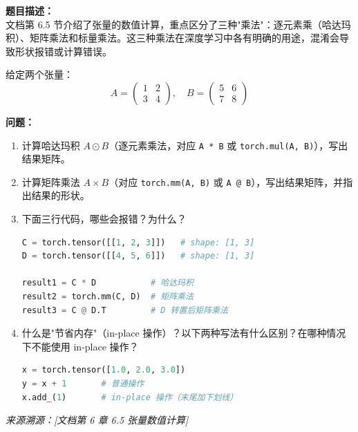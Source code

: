 \documentclass[a4paper,11pt]{ctexart}
\begin{document}
\begin{problembox}
    \textbf{题目描述：}\\
    文档第 6.5 节介绍了张量的数值计算，重点区分了三种"乘法"：逐元素乘（哈达玛积）、矩阵乘法和标量乘法。这三种乘法在深度学习中各有明确的用途，混淆会导致形状报错或计算错误。

    \vspace{0.3cm}
    给定两个张量：
    \[
    A = \begin{pmatrix} 1 & 2 \\ 3 & 4 \end{pmatrix}, \quad
    B = \begin{pmatrix} 5 & 6 \\ 7 & 8 \end{pmatrix}
    \]

    \textbf{问题：}
    \begin{enumerate}[(1)]
        \item 计算哈达玛积 $A \odot B$（逐元素乘法，对应 \texttt{A * B} 或 \texttt{torch.mul(A, B)}），写出结果矩阵。

        \item 计算矩阵乘法 $A \times B$（对应 \texttt{torch.mm(A, B)} 或 \texttt{A @ B}），写出结果矩阵，并指出结果的形状。

        \item 下面三行代码，哪些会报错？为什么？
        \begin{lstlisting}[language=Python]
C = torch.tensor([[1, 2, 3]])   # shape: [1, 3]
D = torch.tensor([[4, 5, 6]])   # shape: [1, 3]

result1 = C * D           # 哈达玛积
result2 = torch.mm(C, D)  # 矩阵乘法
result3 = C @ D.T         # D 转置后矩阵乘法
        \end{lstlisting}

        \item 什么是"节省内存"（in-place 操作）？以下两种写法有什么区别？在哪种情况下不能使用 in-place 操作？
        \begin{lstlisting}[language=Python]
x = torch.tensor([1.0, 2.0, 3.0])
y = x + 1       # 普通操作
x.add_(1)       # in-place 操作（末尾加下划线）
        \end{lstlisting}
    \end{enumerate}

    \vspace{0.2cm}
    {\color{gray}\small\textit{来源溯源：[文档第 6 章 6.5 张量数值计算]}}
\end{problembox}
\end{document}
